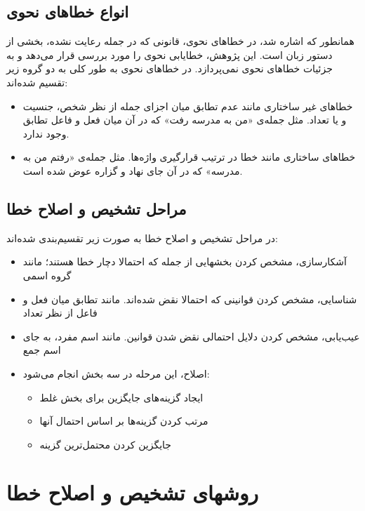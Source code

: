 \documentclass{report}
\begin{document}
\subsection{انواع خطاهای نحوی}
همانطور که اشاره شد، در خطاهای نحوی، قانونی که در جمله رعایت نشده، بخشی از دستور زبان است. این پژوهش، خطایابی نحوی را مورد بررسی قرار می‌دهد و به جزئیات خطاهای نحوی نمی‌پردازد. در \cite{ct3} خطاهای نحوی به طور کلی به دو گروه زیر تقسیم شده‌اند:
\begin{itemize}
\item
خطاهای غیر ساختاری مانند عدم تطابق میان اجزای جمله از نظر شخص، جنسیت و یا تعداد. مثل جمله‌ی «من به مدرسه رفت» که در آن میان فعل و فاعل تطابق وجود ندارد.
\item
خطاهای ساختاری مانند خطا در ترتیب قرارگیری واژه‌ها. مثل جمله‌ی «رفتم من به مدرسه» که در آن جای نهاد و گزاره عوض شده است.
\end{itemize}

\subsection{مراحل تشخیص و اصلاح خطا}
در \cite{ct6} مراحل تشخیص و اصلاح خطا به صورت زیر تقسیم‌بندی شده‌اند:
\begin{itemize}
\item
آشکار‌سازی، مشخص کردن بخشهایی از جمله که احتمالا دچار خطا هستند؛ مانند گروه اسمی
\item
شناسایی، مشخص کردن قوانینی که احتمالا نقض شده‌اند. مانند تطابق میان فعل و فاعل از نظر تعداد
\item
عیب‌یابی، مشخص کردن دلایل احتمالی نقض شدن قوانین. مانند اسم مفرد، به جای اسم جمع
\item
اصلاح، این مرحله در سه بخش انجام می‌شود:
\begin{itemize}
\item
ایجاد گزینه‌های جایگزین برای بخش غلط
\item
مرتب کردن گزینه‌ها بر اساس احتمال آنها
\item
جایگزین کردن محتمل‌ترین گزینه
\end{itemize}
\end{itemize}

\section{روشهای تشخیص و اصلاح خطا}
\end{document}
